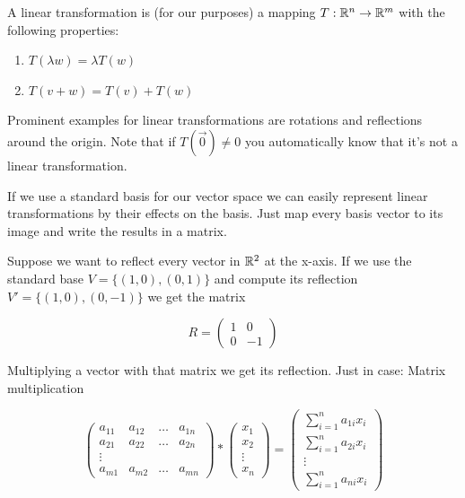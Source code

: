 \begin{Def} A linear transformation is (for our purposes) a mapping $T : \mathbb{R}^n \rightarrow \mathbb{R}^m$ with the following properties:

\begin{enumerate}
\item $T(\lambda w) = \lambda T(w)$
\item $T(v+w) = T(v)+T(w)$
\end{enumerate}
\end{Def}

Prominent examples for linear transformations are rotations and reflections around the origin. Note that if $T(\vec 0)\neq 0$ you automatically know that it's not a linear transformation.

If we use a standard basis for our vector space we can easily represent linear transformations by their effects on the basis. Just map every basis vector to its image and write the results in a matrix. 

\begin{Ex}[Reflection] Suppose we want to reflect every vector in $\mathbb{R}^2$ at the x-axis. If we use the standard base $V = \{(1,0),(0,1)\}$ and compute its reflection $V'=\{(1,0),(0,-1)\}$ we get the matrix

\[R = \begin{pmatrix}
1 & 0 \\
0 & -1
\end{pmatrix}\]

Multiplying a vector with that matrix we get its reflection. Just in case: Matrix multiplication

\[\begin{pmatrix}
a_{11} & a_{12} & \ldots & a_{1n}\\
a_{21} & a_{22} & \ldots & a_{2n}\\
\vdots \\
a_{m1} & a_{m2} & \ldots & a_{mn}
\end{pmatrix} * \begin{pmatrix}x_1\\x_2\\\vdots\\x_n\end{pmatrix} =\begin{pmatrix} \sum_{i=1}^n a_{1i}x_i\\ \sum_{i=1}^n a_{2i}x_i\\\vdots\\\sum_{i=1}^n a_{ni}x_i\end{pmatrix}\]

\end{Ex}

